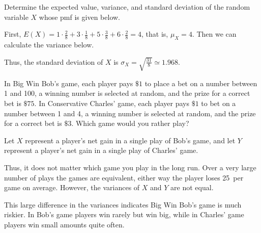 \begin{examp} Determine the expected value, variance, and standard deviation of the random variable $X$ whose pmf is given below.
\renewcommand*{\arraystretch}{1.35}
\renewcommand*{\arraystretch}{1}
\par
\noindent First, $E(X) = 1 \cdot \frac{2}{8} + 3 \cdot \frac{1}{8} + 5 \cdot \frac{3}{8} + 6 \cdot \frac{2}{8} = 4$, that is, $\mu_X = 4$. Then we can calculate the variance below.
\par
\noindent Thus, the standard deviation of $X$ is $\sigma_X = \sqrt{\frac{31}{8}} \simeq 1.968$.
\end{examp}

\begin{examp} In Big Win Bob's game, each player pays $\$1$ to place a bet on a number between 1 and 100, a winning number is selected at random, and the prize for a correct bet is $\$75$. In Conservative Charles' game, each player pays $\$1$ to bet on a number between 1 and 4, a winning number is selected at random, and the prize for a correct bet is $\$3$. Which game would you rather play?
\par
\noindent Let $X$ represent a player's net gain in a single play of Bob's game, and let $Y$ represent a player's net gain in a single play of Charles' game.
\par
\noindent Thus, it does not matter which game you play in the long run. Over a very large number of plays the games are equivalent, either way the player loses 25\textcent\ per game on average. However, the variances of $X$ and $Y$ are not equal.
\par
\noindent This large difference in the variances indicates Big Win Bob's game is much riskier. In Bob's game players win rarely but win big, while in Charles' game players win small amounts quite often.

\end{examp}

